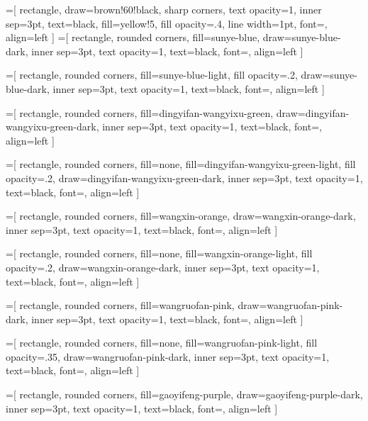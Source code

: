 \newcommand{\TLM}{Safety in Scale: A Survey of Large Model Safety}
=[
    rectangle,
    draw=brown!60!black,
    sharp corners,
    text opacity=1,
    inner sep=3pt, 
    text=black,
    fill=yellow!5,
    fill opacity=.4, 
    line width=1pt,
    font=\tiny,
    align=left
]
=[
    rectangle,
    rounded corners, 
    fill=sunye-blue, 
    draw=sunye-blue-dark,
    inner sep=3pt, 
    text opacity=1,
    text=black, 
    font=\tiny, 
    align=left 
]

=[
    rectangle,
    rounded corners, 
    fill=sunye-blue-light, 
    fill opacity=.2,
    draw=sunye-blue-dark,
    inner sep=3pt, 
    text opacity=1,
    text=black, 
    font=\tiny, 
    align=left 
]

=[
    rectangle,
    rounded corners, 
    fill=dingyifan-wangyixu-green, 
    draw=dingyifan-wangyixu-green-dark, 
    inner sep=3pt, 
    text opacity=1,
    text=black, 
    font=\tiny, 
    align=left 
]

=[
    rectangle,
    rounded corners, 
    fill=none, 
    fill=dingyifan-wangyixu-green-light, 
    fill opacity=.2,
    draw=dingyifan-wangyixu-green-dark,
    inner sep=3pt, 
    text opacity=1,
    text=black, 
    font=\tiny, 
    align=left 
]

=[
    rectangle,
    rounded corners, 
    fill=wangxin-orange, 
    draw=wangxin-orange-dark, 
    inner sep=3pt, 
    text opacity=1,
    text=black, 
    font=\tiny, 
    align=left 
]

=[
    rectangle,
    rounded corners, 
    fill=none, 
    fill=wangxin-orange-light, 
    fill opacity=.2,
    draw=wangxin-orange-dark,
    inner sep=3pt, 
    text opacity=1,
    text=black, 
    font=\tiny, 
    align=left 
]

=[
    rectangle,
    rounded corners, 
    fill=wangruofan-pink, 
    draw=wangruofan-pink-dark, 
    inner sep=3pt, 
    text opacity=1,
    text=black, 
    font=\tiny, 
    align=left 
]

=[
    rectangle,
    rounded corners, 
    fill=none, 
    fill=wangruofan-pink-light, 
    fill opacity=.35,
    draw=wangruofan-pink-dark,
    inner sep=3pt, 
    text opacity=1,
    text=black, 
    font=\tiny, 
    align=left 
]

=[
    rectangle,
    rounded corners, 
    fill=gaoyifeng-purple, 
    draw=gaoyifeng-purple-dark, 
    inner sep=3pt, 
    text opacity=1,
    text=black, 
    font=\tiny, 
    align=left 
]

